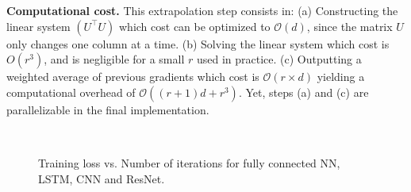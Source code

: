\documentclass[11pt]{article}
\theoremstyle{k}
\begin{document}
\textbf{Computational cost.} This extrapolation step consists in: \textsf{(a)} Constructing the linear system $(U^\top U)$ which cost can be optimized to $\mathcal O(d)$, since the matrix $U$ only changes one column at a time. \textsf{(b)} Solving the linear system which cost is $O(r^3)$, and is negligible for a small $r$ used in practice.\textsf{ (c)} Outputting a weighted average of previous gradients which cost is $\mathcal O(r \times d)$ yielding a computational overhead of $\mathcal O\left((r+1)d+r^3\right)$.
Yet, steps (a) and (c) are parallelizable in the final implementation.

\begin{figure}[t]
\mbox{
}
\caption{Training loss vs. Number of iterations for fully connected NN, LSTM, CNN and ResNet.}
\label{fig:train_loss}
\end{figure}
\end{document}
